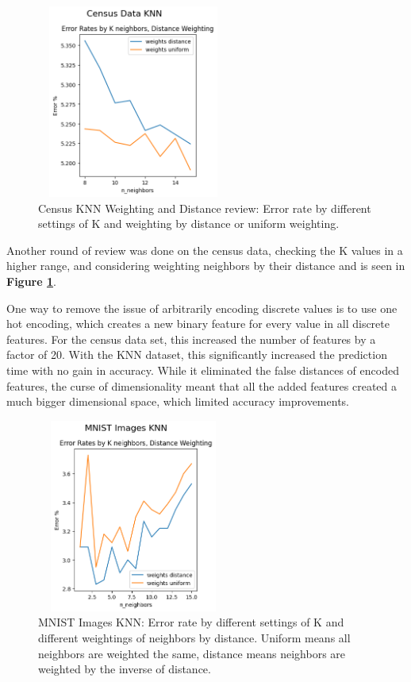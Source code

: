 \documentclass[letterpaper]{article} %
\begin{document}
\begin{figure}[h]
\centering
\includegraphics[width=2.5in, height=2.5in]{figures/Census_Data_KNN_knn_2.png}
\caption{Census KNN Weighting and Distance review:  Error rate by different settings of K and weighting by distance or uniform weighting.  }
\label{fig:census_knn_2}
\end{figure}

Another round of review was done on the census data, checking the K values in a higher range, and considering weighting neighbors by their distance and is seen in \textbf{Figure \ref{fig:census_knn_2}}.  

One way to remove the issue of arbitrarily encoding discrete values is to use one hot encoding, which creates a new binary feature for every value in all discrete features.  For the census data set, this increased the number of features by a factor of 20. With the KNN dataset, this significantly increased the prediction time with no gain in accuracy.  While it eliminated the false distances of encoded features, the curse of dimensionality meant that all the added features created a much bigger dimensional space, which limited accuracy improvements. 

\begin{figure}[h]
\centering
\includegraphics[width=2.5in, height=2.5in]{figures/MNIST_Images_KNN_knn_1.png}
\caption{MNIST Images KNN:  Error rate by different settings of K and different weightings of neighbors by distance.  Uniform means all neighbors are weighted the same, distance means neighbors are weighted by the inverse of distance.  }
\label{fig:mnist_knn_1}
\end{figure}
\end{document}
